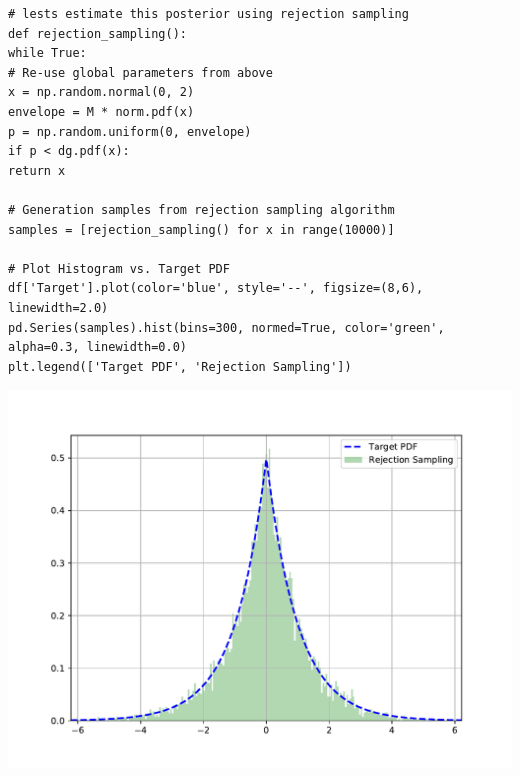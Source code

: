 \documentclass{article}
\begin{document}
\begin{lstlisting}
# lests estimate this posterior using rejection sampling
def rejection_sampling():
while True:
# Re-use global parameters from above
x = np.random.normal(0, 2)
envelope = M * norm.pdf(x)
p = np.random.uniform(0, envelope)
if p < dg.pdf(x):
return x

# Generation samples from rejection sampling algorithm
samples = [rejection_sampling() for x in range(10000)]

# Plot Histogram vs. Target PDF
df['Target'].plot(color='blue', style='--', figsize=(8,6), linewidth=2.0)
pd.Series(samples).hist(bins=300, normed=True, color='green', 
alpha=0.3, linewidth=0.0)
plt.legend(['Target PDF', 'Rejection Sampling'])
\end{lstlisting}
\includegraphics[scale=0.5]{fig2.pdf}
\end{document}
